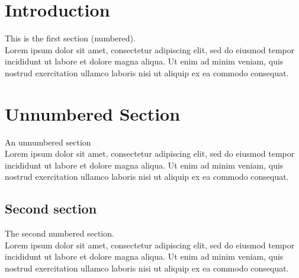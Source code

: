 \newcommand\shortlorem{Lorem ipsum dolor sit amet, consectetur adipiscing elit, sed do eiusmod tempor incididunt ut labore et dolore magna aliqua. Ut enim ad minim veniam, quis nostrud exercitation ullamco laboris nisi ut aliquip ex ea commodo consequat.}

\section{Introduction}
This is the first section (numbered). \\

\shortlorem

\section*{Unnumbered Section}
An unnumbered section \\

\shortlorem

\subsection*{Second section}
The second numbered section. \\

\shortlorem